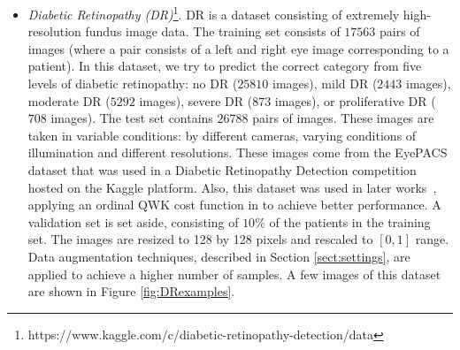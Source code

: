 \documentclass[journal]{IEEEtran}
\begin{document}
	\begin{itemize}
		\item \textit{Diabetic Retinopathy (DR)}\footnote{https://www.kaggle.com/c/diabetic-retinopathy-detection/data}. DR is a dataset consisting of extremely high-resolution fundus image data. The training set consists of $17563$ pairs of images (where a  pair consists of a left and right eye image corresponding to a patient). In this dataset, we try to predict the correct category from five levels of diabetic retinopathy: no DR ($25810$ images), mild DR ($2443$ images), moderate DR ($5292$ images), severe DR ($873$ images), or proliferative DR ($708$ images). The test set contains $26788$ pairs of images. These images are taken in variable conditions: by different cameras, varying conditions of illumination and different resolutions. These images come from the EyePACS dataset that was used in a Diabetic Retinopathy Detection competition hosted on the Kaggle platform. Also, this dataset was used in later works~\cite{de2018weighted,nebot2016diabetic}, applying an ordinal QWK cost function in \cite{de2018weighted} to achieve better performance. A validation set is set aside, consisting of $10\%$ of the patients in the training set. The images are resized to 128 by 128 pixels and rescaled to $[0,1]$ range. Data augmentation techniques, described in Section \ref{sect:settings}, are applied to achieve a higher number of samples. A few images of this dataset are shown in Figure \ref{fig:DRexamples}.
		

\end{itemize}
\end{document}

